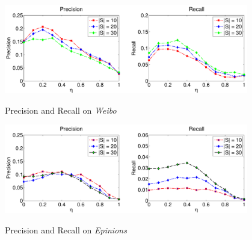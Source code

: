 \documentclass{llncs}
\begin{document}
\begin{figure}[hbt]
\begin{minipage}[t]{0.5\linewidth}
  \centering
  \includegraphics[width=0.95\textwidth]{res/isu_a_pr_weibo.pdf}\\
  \vspace*{-0.4cm}
  \caption{Precision and Recall on \emph{Weibo}} \label{fig:aprweibo}
\end{minipage}%
\begin{minipage}[t]{0.5\linewidth}
  \centering
  \includegraphics[width=0.95\textwidth]{res/isu_a_pr_epinion.pdf}\\
  \vspace*{-0.4cm}
  \caption{Precision and Recall on \emph{Epinions}} \label{fig:aprepinion}
\end{minipage}
\end{figure}
\end{document}
